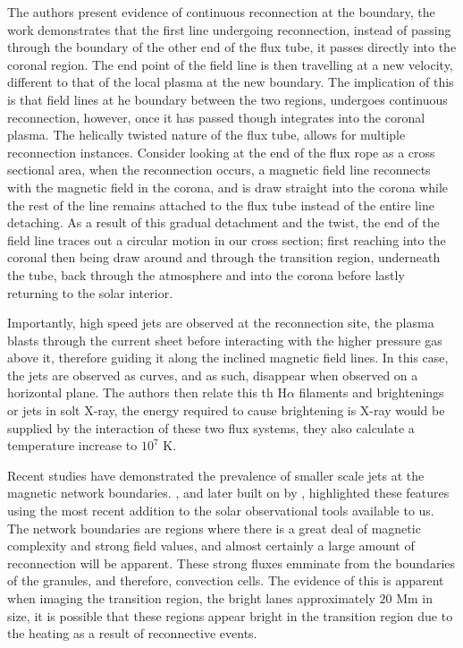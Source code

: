 The authors present evidence of continuous reconnection at the boundary, the work demonstrates that the first line undergoing reconnection, instead of passing through the boundary of the other end of the flux tube, it passes directly into the coronal region.
The end point of the field line is then travelling at a new velocity, different to that of the local plasma at the new boundary.
The implication of this is that field lines at he boundary between the two regions, undergoes continuous reconnection, however, once it has passed though integrates into the coronal plasma.
The helically twisted nature of the flux tube, allows for multiple reconnection instances.
Consider looking at the end of the flux rope as a cross sectional area, when the reconnection occurs, a magnetic field line reconnects with the magnetic field in the corona, and is draw straight into the corona while the rest of the line remains attached to the flux tube instead of the entire line detaching.
As a result of this gradual detachment and the twist, the end of the field line traces out a circular motion in our cross section; first reaching into the coronal then being draw around and through the transition region, underneath the tube, back through the atmosphere and into the corona before lastly returning to the solar interior.

Importantly, high speed jets are observed at the reconnection site, the plasma blasts through the current sheet before interacting with the higher pressure gas above it, therefore guiding it along the inclined magnetic field lines.
In this case, the jets are observed as curves, and as such, disappear when observed on a horizontal plane.
The authors then relate this th H$\alpha$ filaments and brightenings or jets in solt X-ray, the energy required to cause brightening is X-ray would be supplied by the interaction of these two flux systems, they also calculate a temperature increase to $10^7$ K.

Recent studies have demonstrated the prevalence of smaller scale jets at the magnetic network boundaries.
\cite{Tian02014}, and later built on by \cite{Nagrang2016}, highlighted these features using the most recent addition to the solar observational tools available to us.
The network boundaries are regions where there is a great deal of magnetic complexity and strong field values, and almost certainly a large amount of reconnection will be apparent.
These strong fluxes emminate from the boundaries of the granules, and therefore, convection cells.
The evidence of this is apparent when imaging the transition region, the bright lanes approximately $20$ Mm in size, it is possible that these regions appear bright in the transition region due to the heating as a result of reconnective events. 


